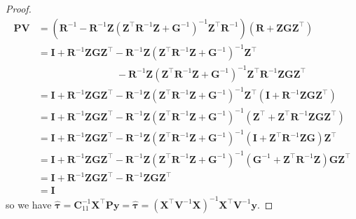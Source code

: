 \documentclass[
  a4paper,
  oneside,
  openany,
  12pt,
  onecolumn]{book}
\theoremstyle{definition}
\theoremstyle{definition}
\theoremstyle{plain}
\theoremstyle{remark}
\begin{document}
\begin{proof}
\[\begin{aligned}
\boldsymbol{P}\boldsymbol{V} &=(\boldsymbol{R}^{-1}-\boldsymbol{R}^{-1}\boldsymbol{Z}(\boldsymbol{Z}^\top\boldsymbol{R}^{-1}\boldsymbol{Z}+\boldsymbol{G}^{-1})^{-1}\boldsymbol{Z}^\top\boldsymbol{R}^{-1})(\boldsymbol{R}+\boldsymbol{Z}\boldsymbol{G}\boldsymbol{Z}^\top)\\
&= \boldsymbol{I} + \boldsymbol{R}^{-1}\boldsymbol{Z}\boldsymbol{G}\boldsymbol{Z}^\top - \boldsymbol{R}^{-1}\boldsymbol{Z}(\boldsymbol{Z}^\top\boldsymbol{R}^{-1}\boldsymbol{Z}+\boldsymbol{G}^{-1})^{-1}\boldsymbol{Z}^\top \\
&\quad \quad \quad \quad \quad \quad\quad\quad -\boldsymbol{R}^{-1}\boldsymbol{Z}(\boldsymbol{Z}^\top\boldsymbol{R}^{-1}\boldsymbol{Z}+\boldsymbol{G}^{-1})^{-1}\boldsymbol{Z}^\top\boldsymbol{R}^{-1}\boldsymbol{Z}\boldsymbol{G}\boldsymbol{Z}^\top\\
&=\boldsymbol{I} + \boldsymbol{R}^{-1}\boldsymbol{Z}\boldsymbol{G}\boldsymbol{Z}^\top -\boldsymbol{R}^{-1}\boldsymbol{Z}(\boldsymbol{Z}^\top\boldsymbol{R}^{-1}\boldsymbol{Z}+\boldsymbol{G}^{-1})^{-1}\boldsymbol{Z}^\top(\boldsymbol{I}+\boldsymbol{R}^{-1}\boldsymbol{Z}\boldsymbol{G}\boldsymbol{Z}^\top)\\
&=\boldsymbol{I} + \boldsymbol{R}^{-1}\boldsymbol{Z}\boldsymbol{G}\boldsymbol{Z}^\top -\boldsymbol{R}^{-1}\boldsymbol{Z}(\boldsymbol{Z}^\top\boldsymbol{R}^{-1}\boldsymbol{Z}+\boldsymbol{G}^{-1})^{-1}(\boldsymbol{Z}^\top+\boldsymbol{Z}^\top\boldsymbol{R}^{-1}\boldsymbol{Z}\boldsymbol{G}\boldsymbol{Z}^\top)\\
&= \boldsymbol{I} + \boldsymbol{R}^{-1}\boldsymbol{Z}\boldsymbol{G}\boldsymbol{Z}^\top -\boldsymbol{R}^{-1}\boldsymbol{Z}(\boldsymbol{Z}^\top\boldsymbol{R}^{-1}\boldsymbol{Z}+\boldsymbol{G}^{-1})^{-1}(\boldsymbol{I}+\boldsymbol{Z}^\top\boldsymbol{R}^{-1}\boldsymbol{Z}\boldsymbol{G})\boldsymbol{Z}^\top\\
&= \boldsymbol{I} + \boldsymbol{R}^{-1}\boldsymbol{Z}\boldsymbol{G}\boldsymbol{Z}^\top -\boldsymbol{R}^{-1}\boldsymbol{Z}(\boldsymbol{Z}^\top\boldsymbol{R}^{-1}\boldsymbol{Z}+\boldsymbol{G}^{-1})^{-1}(\boldsymbol{G}^{-1}+\boldsymbol{Z}^\top\boldsymbol{R}^{-1}\boldsymbol{Z})\boldsymbol{G}\boldsymbol{Z}^\top\\
&= \boldsymbol{I}+\boldsymbol{R}^{-1}\boldsymbol{Z}\boldsymbol{G}\boldsymbol{Z}^\top-\boldsymbol{R}^{-1}\boldsymbol{Z}\boldsymbol{G}\boldsymbol{Z}^\top\\
& = \boldsymbol{I}
\end{aligned}\] so we have
\(\hat{\boldsymbol{\tau}}=\boldsymbol{C}_{11}^{-1}\boldsymbol{X}^\top\boldsymbol{P}\boldsymbol{y}=\hat{\boldsymbol{\tau}}= (\boldsymbol{X}^\top\boldsymbol{V}^{-1}\boldsymbol{X})^{-1}\boldsymbol{X}^\top\boldsymbol{V}^{-1}\boldsymbol{y}\).
\end{proof}
\end{document}
